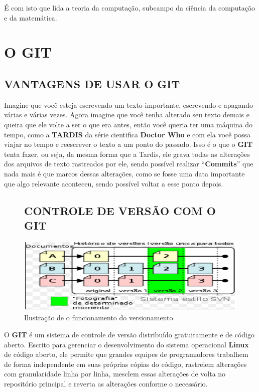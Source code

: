 \cite{whocomputing}

É com isto que lida a teoria da computação, subcampo da ciência da computação e da matemática. 

\section{O GIT}
\label{sec:OGIT}

	\subsection{VANTAGENS DE USAR O GIT}
	\label{sec:VANTAGENSGIT}

		Imagine que você esteja escrevendo um texto importante, escrevendo e apagando várias e várias vezes. Agora imagine que você tenha alterado seu texto demais e queira que ele volte a ser o que era antes, então você queria ter uma máquina do tempo, como a \textbf{TARDIS} da série cientifica \textbf{Doctor Who} e com ela você possa viajar no tempo e reescrever o texto a um ponto do passado. Isso é o que o \textbf{GIT} tenta fazer, ou seja, da mesma forma que a Tardis, ele grava todas as alterações dos arquivos de texto rastreados por ele, sendo possível realizar “\textbf{Commits}” que nada mais é que marcos dessas alterações, como se fosse uma data importante que algo relevante aconteceu, sendo possível voltar a esse ponto depois. 		

\begin{figure}
	\subsection{CONTROLE DE VERSÃO COM O GIT}
	\label{sec:CONTROLEVERSAOGIT}

	\centering
	\caption{Ilustração de o funcionamento do versionamento}
	\centering
	\includegraphics[scale=0.75]{./images/Figure_1}	
	
	\label{fig:Fig1}
\end{figure}

O \textbf{GIT} é um sistema de controle de versão distribuído gratuitamente e de código aberto. Escrito para gerenciar o
desenvolvimento do sistema operacional \textbf{Linux} de código aberto,
ele permite que grandes equipes de programadores trabalhem de
forma independente em suas próprias cópias do código, rastreiem
alterações com granularidade linha por linha, mesclem essas
alterações de volta no repositório principal e reverta as 
alterações conforme o necessário. \cite{whygit} 	

